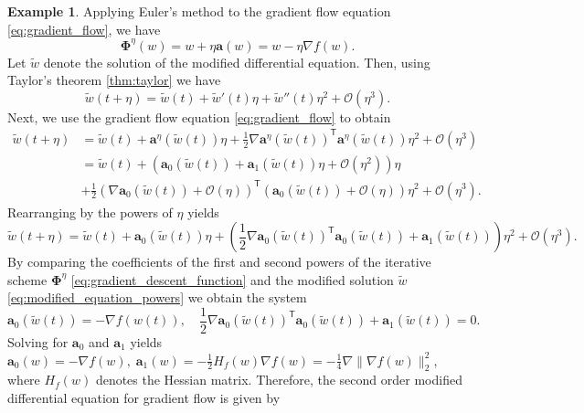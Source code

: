 \documentclass[12pt]{article}
\theoremstyle{definition}
\newtheorem{example}[example]{Example}
\numberwithin{equation}{section}
\newcommand{\CO}{\mathcal{O}}
\newcommand{\T}{\mathsf{T}}
\newcommand{\norm}[1]{\lVert{#1}\rVert_2}
\begin{document}
\begin{example}
Applying Euler's method to the gradient flow equation \eqref{eq:gradient_flow}, we have 
\begin{equation}
  \label{eq:gradient_descent_function}
  \mathbf{\Phi}^\eta(w) = w + \eta \mathbf{a}(w) = w - \eta \nabla f(w).
\end{equation}
 Let $\widetilde{w}$ denote the solution of the modified differential equation. Then, using Taylor's theorem \autoref{thm:taylor} we have
  \begin{equation*}
    \widetilde{w}(t+\eta) = \widetilde{w}(t) + \widetilde{w}'(t)\eta + \widetilde{w}''(t)\eta^2 + \CO(\eta^3).
  \end{equation*}
  Next, we use the gradient flow equation \eqref{eq:gradient_flow} to obtain
\begin{align*}
  \widetilde{w}(t+\eta) &= \widetilde{w}(t) + \mathbf{a}^\eta(\widetilde{w}(t))\eta + \frac{1}{2}\nabla \mathbf{a}^\eta(\widetilde{w}(t))^\T\mathbf{a}^\eta(\widetilde{w}(t)) \eta^2 + \CO(\eta^3) \\
  &= \widetilde{w}(t) + (\mathbf{a}_0(\widetilde{w}(t)) + \mathbf{a}_1(\widetilde{w}(t))\eta + \CO(\eta^2))\eta \\
  &+ \frac{1}{2}(\nabla \mathbf{a}_0(\widetilde{w}(t)) + \CO(\eta))^\T(\mathbf{a}_0(\widetilde{w}(t)) + \CO(\eta))\eta^2 + \CO(\eta^3).
\end{align*}
Rearranging by the powers of $\eta$ yields
\begin{equation}
  \label{eq:modified_equation_powers}
  \widetilde{w}(t+\eta) = \widetilde{w}(t) + \mathbf{a}_0(\widetilde{w}(t))\eta + \left( \frac{1}{2}\nabla \mathbf{a}_0(\widetilde{w}(t))^\T \mathbf{a}_0(\widetilde{w}(t)) + \mathbf{a}_1(\widetilde{w}(t))\right)\eta^2 + \CO(\eta^3). 
\end{equation}
By comparing the coefficients of the first and second powers of the iterative scheme $\mathbf{\Phi}^\eta$ \eqref{eq:gradient_descent_function} and the modified solution $\widetilde{w}$ \eqref{eq:modified_equation_powers} we obtain the system
\begin{equation*}
    \mathbf{a}_0(\widetilde{w}(t)) = - \nabla f(w(t)), \quad
    \frac{1}{2}\nabla \mathbf{a}_0(\widetilde{w}(t))^\T \mathbf{a}_0(\widetilde{w}(t)) + \mathbf{a}_1(\widetilde{w}(t)) = 0.
\end{equation*}
Solving for $\mathbf{a}_0$ and $\mathbf{a}_1$ yields $\mathbf{a}_0(w) = -\nabla f(w), \; \mathbf{a}_1(w) = - \frac{1}{2} H_f(w)\nabla f(w) = -\frac{1}{4}\nabla\norm{\nabla f(w)}^2$, where $H_f(w)$ denotes the Hessian matrix. Therefore, the second order modified differential equation for gradient flow is given by

\end{example}
\end{document}
